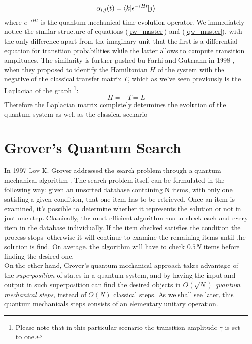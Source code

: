 \begin{equation}
  \alpha_{l,j}(t) = \braket{k|e^{-iHt}|j}
  \label{qw_master}
\end{equation}
where $e^{-iHt}$ is the quantum mechanical time-evolution operator. We immediately notice the similar structure of equations (\ref{rw_master}) and (\ref{qw_master}), with the only difference apart from the imaginary unit  that the first is a differential equation for transition probabilities while the latter allows to compute transition amplitudes. The similarity is further pushed bu Farhi and Gutmann in 1998 \cite{Childs2001}, when they proposed to identify the Hamiltonian $H$ of the system with the negative of the classical transfer matrix $T$, which as we've seen previously is the Laplacian of the graph \footnote{Please note that in this particular scenario the transition amplitude $\gamma$ is set to one.}:
\begin{equation}
  H = -T = L
  \label{qw_hamiltonian}
\end{equation}
Therefore the Laplacian matrix completely determines the evolution of the quantum system as well as the classical scenario.



\section{Grover's Quantum Search}
In 1997 Lov K. Grover addressed the search problem through a quantum mechanical algorithm \cite{Grover1997}. The search problem itself can be formulated in the following way: given an unsorted database containing N items, with only one satisfing a given condition, that one item has to be retrieved. Once an item is examined, it's possible to determine whether it represents the solution or not in just one step.
Classically, the most efficient algorithm has to check each and every item in the database individually. If the item checked satisfies the condition the process stops, otherwise it will continue to examine the remaining items until the solution is find. On average, the algorithm will have to check $0.5N$ items before finding the desired one.\\On the other hand, Grover's quantum mechanical approach takes advantage of the \textit{superposition} of states in a quantum system, and by having the input and output in such superposition can find the desired objects in $O(\sqrt{N})$ \textit{quantum mechanical steps}, instead of $O(N)$ classical steps. As we shall see later, this quantum mechanicals steps consists of an elementary unitary operation. \\

